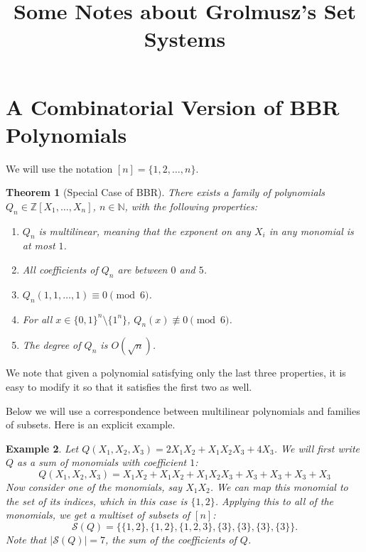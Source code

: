 \documentclass[12pt]{article}
\title{Some Notes about Grolmusz's Set Systems}
\newtheorem{theorem}{Theorem}[section]
\newtheorem{example}[theorem]{Example}
\def\Z{{\mathbb Z}}
\def\N{{\mathbb N}}
\newcommand{\bits}{\{0,1\}}
\newcommand{\calS}{\mathcal{S}}
\begin{document}
\maketitle

\section{A Combinatorial Version of BBR Polynomials}

We will use the notation $[n] = \{1,2,\ldots,n\}$.

\begin{theorem}[Special Case of BBR]
  There exists a family of polynomials $Q_n \in \Z[X_1,\ldots,X_n]$,
  $n\in\N$, with
  the following properties:
  \begin{enumerate}
    \item $Q_n$ is multilinear, meaning that the exponent on any $X_i$ in
      any monomial is at most $1$.
    \item All coefficients of $Q_n$ are between $0$ and $5$.
    \item $Q_n(1,1,\ldots,1) \equiv 0 \pmod 6$.
    \item For all $x\in \bits^n\setminus \{1^n\}$, 
      $Q_n(x) \not\equiv 0 \pmod 6$.
    \item The degree of $Q_n$ is $O(\sqrt{n})$.
  \end{enumerate}
\end{theorem}
We note that given a polynomial satisfying only the last three properties, it is
easy to modify it so that it satisfies the first two as well.


Below we will use a correspondence between multilinear polynomials and families
of subsets. Here is an explicit example.
\begin{example}
  Let $Q(X_1,X_2,X_3) = 2X_1X_2 + X_1X_2X_3 + 4X_3$. We will first write $Q$ as
  a sum of monomials with coefficient $1$:
  \[
    Q(X_1,X_2,X_3) = X_1X_2 + X_1X_2 + X_1X_2X_3 + X_3 + X_3 + X_3 + X_3
  \]
  Now consider one of the monomials, say $X_1 X_2$. We can map this monomial to the
  set of its indices, which in this case is $\{1,2\}$. Applying this to all of
  the monomials, we get a multiset of subsets of $[n]$:
  \[
    \calS(Q) = \{ \{1,2\},  \{1,2\}, \{1,2,3\}, \{3\}, \{3\},\{3\},\{3\} \}.
  \]
  Note that $|\calS(Q)| = 7$, the sum of the coefficients of $Q$.
\end{example}
\end{document}
